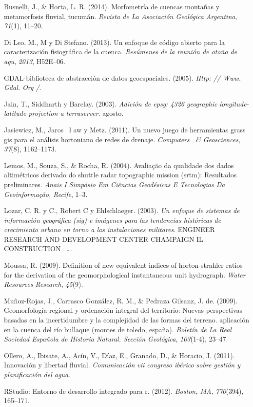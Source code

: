 \documentclass[11pt,]{article}
\begin{document}
\hypertarget{ref-busnelli2014morfometria}{}
Busnelli, J., \& Horta, L. R. (2014). Morfometría de cuencas montañas y
metamorfosis fluvial, tucumán. \emph{Revista de La Asociación Geológica
Argentina}, \emph{71}(1), 11--20.

\hypertarget{ref-di2013open}{}
Di Leo, M., M y Di Stefano. (2013). Un enfoque de código abierto para la
caracterización fisiográfica de la cuenca. \emph{Resúmenes de la reunión
de otoño de agu}, \emph{2013}, H52E--06.

\hypertarget{ref-warmerdam2005gdal}{}
GDAL-biblioteca de abstracción de datos geoespaciales. (2005).
\emph{Http: // Www. Gdal. Org /}.

\hypertarget{ref-jain2003adding}{}
Jain, T., Siddharth y Barclay. (2003). \emph{Adición de epsg: 4326
geographic longitude-latitude projection a terraserver}. agosto.

\hypertarget{ref-jasiewicz2011new}{}
Jasiewicz, M., Jaros ~l aw y Metz. (2011). Un nuevo juego de
herramientas grass gis para el análisis hortoniano de redes de drenaje.
\emph{Computers ~\& Geosciences}, \emph{37}(8), 1162--1173.

\hypertarget{ref-lemos2004avaliaccao}{}
Lemos, M., Souza, S., \& Rocha, R. (2004). Avaliação da qualidade dos
dados altimétricos derivado do shuttle radar topographic mission (srtm):
Resultados preliminares. \emph{Anais I Simpósio Em Ciências Geodésicas E
Tecnologias Da Geoinformação, Recife}, 1--3.

\hypertarget{ref-lozar2003geographic}{}
Lozar, C. R. y C., Robert C y Ehlschlaeger. (2003). \emph{Un enfoque de
sistemas de información geográfica (sig) e imágenes para las tendencias
históricas de crecimiento urbano en torno a las instalaciones
militares}. ENGINEER RESEARCH AND DEVELOPMENT CENTER CHAMPAIGN IL
CONSTRUCTION ~\ldots{}.

\hypertarget{ref-moussa2009definition}{}
Moussa, R. (2009). Definition of new equivalent indices of
horton-strahler ratios for the derivation of the geomorphological
instantaneous unit hydrograph. \emph{Water Resources Research},
\emph{45}(9).

\hypertarget{ref-munoz2009geomorfologia}{}
Muñoz-Rojas, J., Carrasco González, R. M., \& Pedraza Gilsanz, J. de.
(2009). Geomorfología regional y ordenación integral del territorio:
Nuevas perspectivas basadas en la incertidumbre y la complejidad de las
formas del terreno. aplicación en la cuenca del río bullaque (montes de
toledo, españa). \emph{Boletín de La Real Sociedad Española de Historia
Natural. Sección Geológica}, \emph{103}(1-4), 23--47.

\hypertarget{ref-ollero2011innovacion}{}
Ollero, A., Ibisate, A., Acín, V., Díaz, E., Granado, D., \& Horacio, J.
(2011). Innovación y libertad fluvial. \emph{Comunicación vii congreso
ibérico sobre gestión y planificación del agua}.

\hypertarget{ref-allaire2012rstudio}{}
RStudio: Entorno de desarrollo integrado para r. (2012). \emph{Boston,
MA}, \emph{770}(394), 165--171.




\newpage
\singlespacing 
\end{document}
